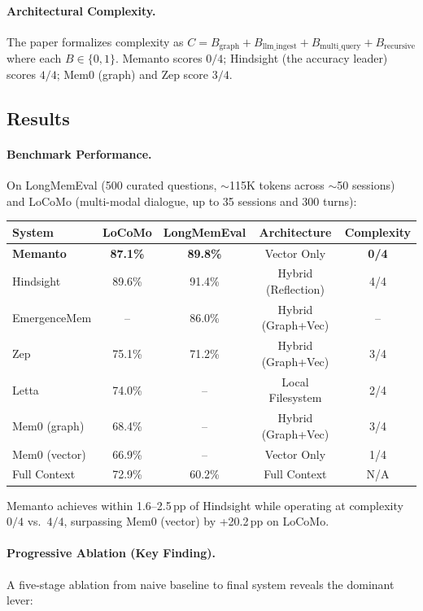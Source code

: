 \documentclass[11pt]{article}
\begin{document}
\paragraph{Architectural Complexity.}
The paper formalizes complexity as $C = B_{\mathrm{graph}} + B_{\mathrm{llm\_ingest}} + B_{\mathrm{multi\_query}} + B_{\mathrm{recursive}}$ where each $B \in \{0, 1\}$. Memanto scores $0/4$; Hindsight (the accuracy leader) scores $4/4$; Mem0 (graph) and Zep score $3/4$.

\subsection{Results}

\paragraph{Benchmark Performance.}
On LongMemEval (500 curated questions, $\sim$115K tokens across $\sim$50 sessions) and LoCoMo (multi-modal dialogue, up to 35 sessions and 300 turns):

\begin{center}
\begin{tabular}{lcccc}
\toprule
\textbf{System} & \textbf{LoCoMo} & \textbf{LongMemEval} & \textbf{Architecture} & \textbf{Complexity} \\
\midrule
\textbf{Memanto} & \textbf{87.1\%} & \textbf{89.8\%} & Vector Only & \textbf{0/4} \\
Hindsight & 89.6\% & 91.4\% & Hybrid (Reflection) & 4/4 \\
EmergenceMem & -- & 86.0\% & Hybrid (Graph+Vec) & -- \\
Zep & 75.1\% & 71.2\% & Hybrid (Graph+Vec) & 3/4 \\
Letta & 74.0\% & -- & Local Filesystem & 2/4 \\
Mem0 (graph) & 68.4\% & -- & Hybrid (Graph+Vec) & 3/4 \\
Mem0 (vector) & 66.9\% & -- & Vector Only & 1/4 \\
Full Context & 72.9\% & 60.2\% & Full Context & N/A \\
\bottomrule
\end{tabular}
\end{center}

Memanto achieves within 1.6--2.5\,pp of Hindsight while operating at complexity $0/4$ vs.\ $4/4$, surpassing Mem0 (vector) by +20.2\,pp on LoCoMo.

\paragraph{Progressive Ablation (Key Finding).}
A five-stage ablation from naive baseline to final system reveals the dominant lever:
\end{document}
